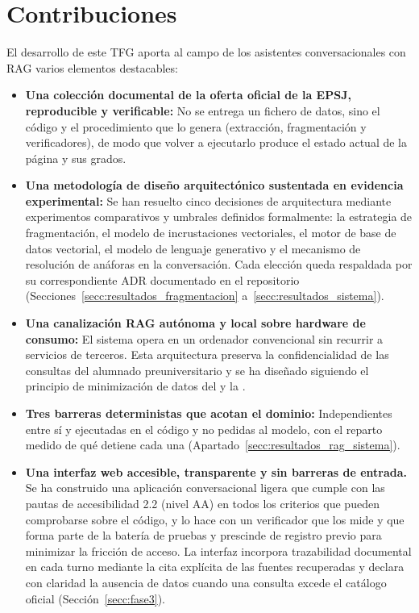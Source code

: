 \section[Contribuciones]{Contribuciones}
\label{secc:contribuciones}

El desarrollo de este TFG aporta al campo de los asistentes conversacionales con RAG varios elementos destacables:

\begin{itemize}
  \item \textbf{Una colección documental de la oferta oficial de la
      EPSJ, reproducible y verificable:} No se entrega un fichero de datos, sino el código y el procedimiento que lo genera (extracción, fragmentación y verificadores), de modo que volver a ejecutarlo produce el estado actual de la página y sus grados.
      

  \item \textbf{Una metodología de diseño arquitectónico sustentada en evidencia experimental:} Se han resuelto cinco decisiones de arquitectura mediante experimentos comparativos y umbrales definidos formalmente: la estrategia de fragmentación, el modelo de incrustaciones vectoriales, el motor de base de datos vectorial, el modelo de lenguaje generativo y el mecanismo de resolución de anáforas en la conversación. Cada elección queda respaldada por su correspondiente ADR documentado en el repositorio (Secciones~\ref{secc:resultados_fragmentacion} a~\ref{secc:resultados_sistema}).

   \item \textbf{Una canalización RAG autónoma y local sobre hardware de consumo:} El sistema opera en un ordenador convencional sin recurrir a servicios de terceros. Esta arquitectura preserva la confidencialidad de las consultas del alumnado preuniversitario y se ha diseñado siguiendo el principio de minimización de datos del  y la .

  \item \textbf{Tres barreras deterministas que acotan el dominio:} Independientes entre sí y ejecutadas en el código y no pedidas al modelo, con el reparto medido de qué detiene cada una (Apartado~\ref{secc:resultados_rag_sistema}).

 \item \textbf{Una interfaz web accesible, transparente y sin barreras de entrada.} Se ha construido una aplicación conversacional ligera que cumple con las pautas de accesibilidad  2.2 (nivel AA) en todos los criterios que pueden comprobarse sobre el código, y lo hace con un verificador que los mide y que forma parte de la batería de pruebas y prescinde de registro previo para minimizar la fricción de acceso. La interfaz incorpora trazabilidad documental en cada turno mediante la cita explícita de las fuentes recuperadas y declara con claridad la ausencia de datos cuando una consulta excede el catálogo oficial (Sección~\ref{secc:fase3}).
\end{itemize}

